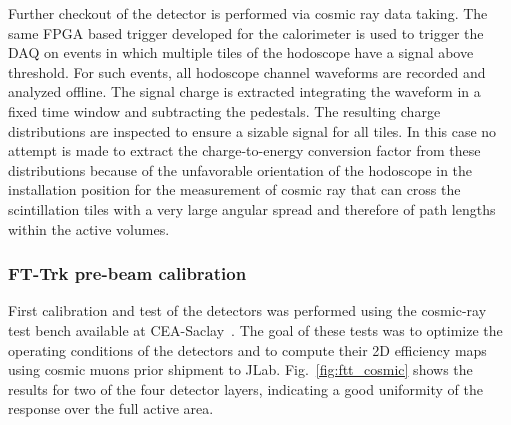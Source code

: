 Further checkout of the detector is performed via cosmic ray data taking. The same FPGA based trigger developed for the calorimeter is used to trigger the DAQ on events in which multiple tiles of the hodoscope have a signal above threshold. For such events, all hodoscope channel waveforms are recorded and analyzed offline. The signal charge is extracted integrating the waveform in a fixed time window and subtracting the pedestals. The resulting charge distributions are inspected to ensure a sizable signal for all tiles. In this case no attempt is made to extract the charge-to-energy conversion factor from these distributions because of the unfavorable orientation of the hodoscope in the installation position for the measurement of cosmic ray that can cross the scintillation tiles with a very large angular spread and therefore of path lengths within the active volumes.

\subsubsection{FT-Trk pre-beam calibration}
First calibration and test of the detectors was performed using the cosmic-ray test bench available at CEA-Saclay~\cite{mm}. The goal of these tests was to optimize the operating conditions
of the detectors and to compute their 2D efficiency maps using cosmic muons prior shipment to JLab. Fig.~\ref{fig:ftt_cosmic} shows the results for two of the four detector layers, indicating a good uniformity of the response over the full active area.

